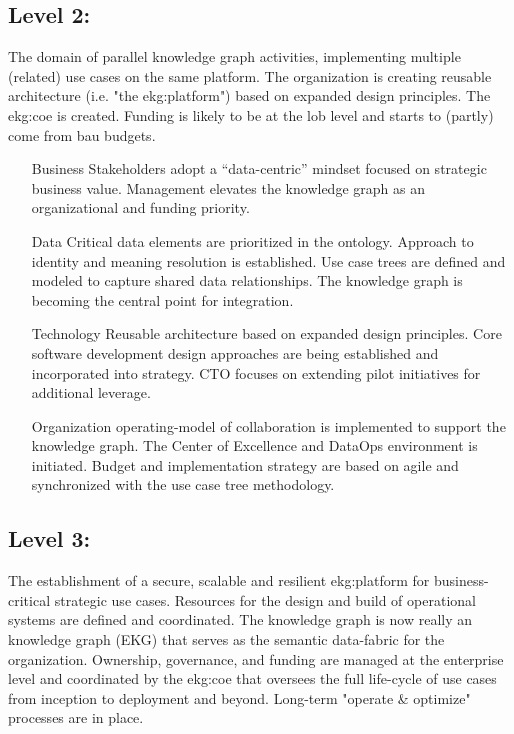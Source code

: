 \subsection{Level 2: \ekgmmLevelTwoLabel}

The domain of parallel knowledge graph activities, implementing multiple (related) use cases on the same platform.
The organization is creating reusable architecture (i.e. "the \gls{ekg:platform}") based on expanded design principles.
The \gls{ekg:coe} is created.
Funding is likely to be at the \gls{lob} level and starts to (partly) come from \gls{bau} budgets.

\begin{itemize}[leftmargin=1in,font=\bfseries]

    \item[Business]     Stakeholders adopt a “data-centric” mindset focused on strategic business value.
                        Management elevates the knowledge graph as an organizational and funding priority.
    \item[Data]         Critical data elements are prioritized in the ontology.
                        Approach to identity and meaning resolution is established.
                        Use case trees are defined and modeled to capture shared data relationships.
                        The knowledge graph is becoming the central point for integration.
    \item[Technology]   Reusable architecture based on expanded design principles.
                        Core software development design approaches are being established and incorporated
                        into strategy.
                        CTO focuses on extending pilot initiatives for additional leverage.
    \item[Organization] \Gls{operating-model} of collaboration is implemented to support the knowledge graph.
                        The Center of Excellence and DataOps environment is initiated.
                        Budget and implementation strategy are based on agile and synchronized with the
                        use case tree methodology.
\end{itemize}

\subsection{Level 3: \ekgmmLevelThreeLabel}

The establishment of a secure, scalable and resilient \gls{ekg:platform} for business-critical strategic use cases.
Resources for the design and build of operational systems are defined and coordinated.
The knowledge graph is now really an  knowledge graph (EKG) that serves as the
semantic data-fabric for the organization.
Ownership, governance, and funding are managed at the enterprise level and coordinated by the \gls{ekg:coe} that
oversees the full life-cycle of use cases from inception to deployment and beyond.
Long-term "operate \& optimize" processes are in place.

